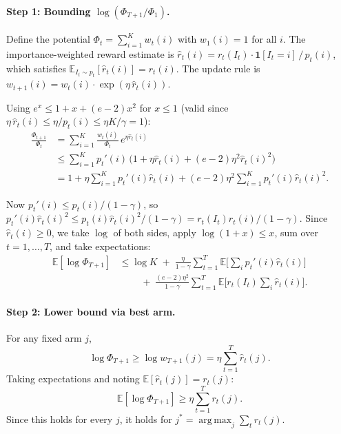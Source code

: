 \documentclass[acmtocl,review,anonymous]{acmart}
\DeclareMathOperator*{\argmax}{arg\,max}
\begin{document}
\paragraph{Step 1: Bounding $\log(\Phi_{T+1}/\Phi_1)$.}
Define the potential $\Phi_t = \sum_{i=1}^{K} w_t(i)$ with
$w_1(i) = 1$ for all $i$.
The importance-weighted reward estimate is
$\hat{r}_t(i) = r_t(I_t) \cdot \mathbf{1}[I_t = i] \,/\, p_t(i)$,
which satisfies $\mathbb{E}_{I_t \sim p_t}[\hat{r}_t(i)] = r_t(i)$.
The update rule is $w_{t+1}(i) = w_t(i) \cdot \exp(\eta\, \hat{r}_t(i))$.

Using $e^x \le 1 + x + (e-2)x^2$ for $x \le 1$ (valid since
$\eta\,\hat{r}_t(i) \le \eta / p_t(i) \le \eta K / \gamma = 1$):
\begin{align}
  \frac{\Phi_{t+1}}{\Phi_t}
  &= \sum_{i=1}^{K} \frac{w_t(i)}{\Phi_t}\, e^{\eta \hat{r}_t(i)}
    \nonumber \\
  &\le \sum_{i=1}^{K} p_t'(i)\,
      \bigl(1 + \eta\hat{r}_t(i) + (e-2)\eta^2\hat{r}_t(i)^2\bigr)
    \nonumber \\
  &= 1 + \eta\sum_{i=1}^{K} p_t'(i)\hat{r}_t(i)
      + (e-2)\eta^2\sum_{i=1}^{K} p_t'(i)\hat{r}_t(i)^2.
    \label{eq:exp3-phi-ratio}
\end{align}

Now $p_t'(i) \le p_t(i)/(1-\gamma)$, so
$p_t'(i)\hat{r}_t(i)^2 \le p_t(i)\hat{r}_t(i)^2/(1-\gamma)
  = r_t(I_t)\hat{r}_t(i)/(1-\gamma)$.
Since $\hat{r}_t(i) \ge 0$, we take $\log$ of both sides,
apply $\log(1+x) \le x$, sum over $t=1,\dots,T$, and take expectations:
\begin{align}
  \mathbb{E}[\log\Phi_{T+1}]
  &\le \log K \;+\;
     \frac{\eta}{1-\gamma} \sum_{t=1}^{T} \mathbb{E}\bigl[
       \textstyle\sum_i p_t'(i)\hat{r}_t(i)
     \bigr] \nonumber \\
  &\qquad\;+\; \frac{(e-2)\eta^2}{1-\gamma} \sum_{t=1}^{T}
     \mathbb{E}\bigl[r_t(I_t)\textstyle\sum_i \hat{r}_t(i)\bigr].
  \label{eq:exp3-log-phi}
\end{align}

\paragraph{Step 2: Lower bound via best arm.}
For any fixed arm $j$,
\[
  \log\Phi_{T+1}
  \ge \log w_{T+1}(j)
  = \eta\sum_{t=1}^{T} \hat{r}_t(j).
\]
Taking expectations and noting
$\mathbb{E}[\hat{r}_t(j)] = r_t(j)$:
\[
  \mathbb{E}[\log\Phi_{T+1}]
  \ge \eta\sum_{t=1}^{T} r_t(j).
\]
Since this holds for every $j$, it holds for
$j^* = \argmax_j \sum_t r_t(j)$.
\end{document}
